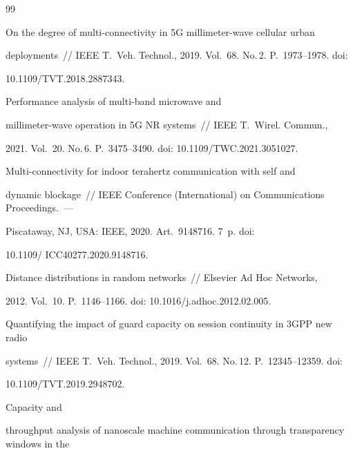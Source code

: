 {{\begin{thebibliography}{99}


 On the degree of multi-connectivity in 5G millimeter-wave cellular urban 


deployments~/\!\!/ IEEE T.~Veh. Technol., 2019. Vol.~68. No.\,2. P.~1973--1978. doi: 


10.1109\!/\!TVT.2018.2887343.




 Performance analysis of multi-band microwave and 


millimeter-wave operation in 5G NR systems~/\!\!/ IEEE T.~Wirel. Commun., 


2021. Vol.~20. No.\,6. P.~3475--3490. doi: 10.1109\!/\!TWC.2021.3051027.




 Multi-connectivity for indoor terahertz communication with self and 


dynamic blockage~/\!\!/ IEEE Conference (International) on Communications Proceedings.~--- 


Piscataway, NJ, USA: IEEE, 2020. Art.~9148716. 7~p. doi: 


10.1109\!/ ICC40277.2020.9148716.




 Distance distributions in random networks~/\!\!/ Elsevier Ad Hoc Networks, 


2012. Vol.~10. P.~1146--1166. doi: 10.1016\!/\!j.adhoc.2012.02.005.




 Quantifying the impact of guard capacity on session continuity in 3GPP new radio 


systems~/\!\!/ IEEE T.~Veh. Technol., 2019. Vol.~68. No.\,12. P.~12345--12359. doi: 


10.1109\!/\!TVT.2019.2948702.




 Capacity and 


throughput analysis of nanoscale machine communication through transparency windows in the 



\end{thebibliography}}}

